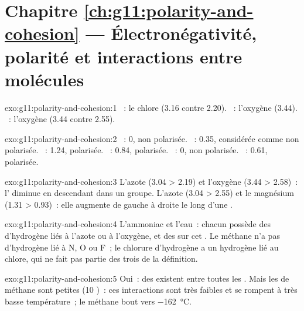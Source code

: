 \section*{Chapitre \ref{ch:g11:polarity-and-cohesion} --- Électronégativité, polarité et interactions entre molécules}

\begin{solution}{exo:g11:polarity-and-cohesion:1}
~: le chlore (3.16 contre 2.20). ~: l'oxygène (3.44).
~: l'oxygène (3.44 contre 2.55).
\end{solution}

\begin{solution}{exo:g11:polarity-and-cohesion:2}
~: 0, non polarisée. ~: 0.35, considérée comme non
polarisée. ~: 1.24, polarisée. ~: 0.84, polarisée.
~: 0, non polarisée. ~: 0.61, polarisée.
\end{solution}

\begin{solution}{exo:g11:polarity-and-cohesion:3}
L'azote (3.04 > 2.19) et l'oxygène (3.44 > 2.58)~: l'
diminue en descendant dans un groupe. L'azote (3.04 > 2.55) et le
magnésium (1.31 > 0.93)~: elle augmente de gauche à droite le long
d'une .
\end{solution}

\begin{solution}{exo:g11:polarity-and-cohesion:4}
L'ammoniac et l'eau~: chacun possède des  d'hydrogène liés à
l'azote ou à l'oxygène, et des  sur cet . Le
méthane n'a pas d'hydrogène lié à N, O ou F~; le chlorure d'hydrogène a
un hydrogène lié au chlore, qui ne fait pas partie des trois  de
la définition.
\end{solution}

\begin{solution}{exo:g11:polarity-and-cohesion:5}
Oui~: des  existent entre toutes les
. Mais les  de méthane sont petites (10 )~:
ces interactions sont très faibles et se rompent à très basse
température~; le méthane bout vers \qty{-162}{\celsius}.
\end{solution}

